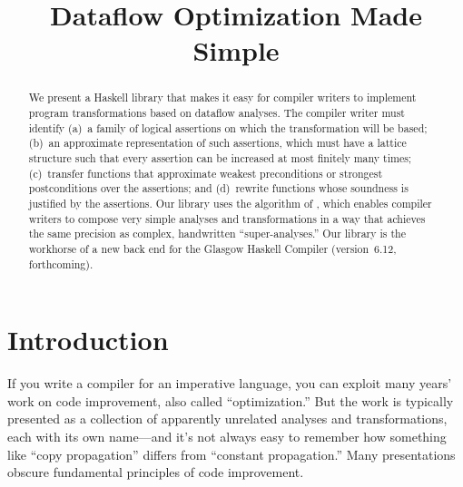 \documentclass[blockstyle,preprint,natbib,nocopyrightspace]{sigplanconf}
\def\authornote#1{\unskip\relax}
\newcommand{\simon}[1]{\authornote{SLPJ: #1}}
\begin{document}
\title{Dataflow Optimization Made Simple}



\maketitle
 
\begin{abstract}
We present a Haskell library that makes it easy for compiler writers
to implement program transformations based on dataflow analyses.
The compiler writer must identify (a)~a family of logical assertions
on which the transformation will be based;
(b)~an {approximate}
representation of such assertions, which
must have a lattice structure such that every assertion can be increased at
most finitely many times;
(c)~transfer functions that approximate weakest preconditions or
strongest postconditions over the assertions; and
(d)~rewrite functions whose soundness is justified by the assertions.
Our library uses the algorithm of 
\citet{lerner-grove-chambers:2002}, which enables compiler writers to
compose very simple analyses and transformations in a way that achieves
the same precision as complex, handwritten
``super-analyses.''
Our library is the workhorse of a new
back end for the Glasgow Haskell Compiler (version~6.12, forthcoming).
\end{abstract}

\makeatactive   %

\section{Introduction}

\ifpagetuning\enlargethispage{\baselineskip}\fi

If you write a compiler for an imperative language, you can exploit
many years' work on code improvement, also called
``optimization.''
But the work is typically presented
as a collection of apparently unrelated analyses and
transformations, each with its own name---and 
it's not always easy to %
remember how something like
``copy propagation'' differs from ``constant propagation.''
Many presentations obscure fundamental principles of
code improvement.
\end{document}
